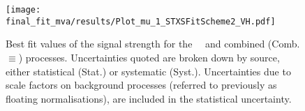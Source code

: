 \begin{figure}[hb]
	\centering
	\texttt{[image: final\_fit\_mva/results/Plot\_mu\_1\_STXSFitScheme2\_VH.pdf]}
  \caption{Best fit values of the signal strength for the \WH\, \ZH\ and
    combined (Comb.$\equiv$\VH) processes. Uncertainties quoted are broken down
    by source, either statistical (Stat.) or systematic (Syst.). Uncertainties
    due to scale factors on background processes (referred to previously as
    floating normalisations), are included in the statistical uncertainty.}
  \label{fig:WZH-mus}
\end{figure}